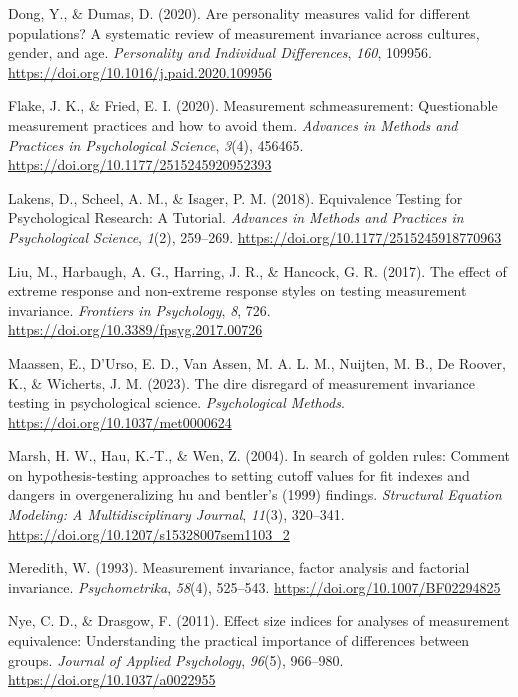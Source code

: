 \documentclass[
  man]{apa7}
\newlength{\cslhangindent}
\newenvironment{CSLReferences}[2] %
 {\begin{list}{}{%
  \setlength{\itemindent}{0pt}
  \setlength{\leftmargin}{0pt}
  \setlength{\parsep}{0pt}
  \ifodd #1
   \setlength{\leftmargin}{\cslhangindent}
   \setlength{\itemindent}{-1\cslhangindent}
  \fi
  \setlength{\itemsep}{#2\baselineskip}}}
 {\end{list}}
\begin{document}
\begin{CSLReferences}{1}{0}
Dong, Y., \& Dumas, D. (2020). Are personality measures valid for different populations? A systematic review of measurement invariance across cultures, gender, and age. \emph{Personality and Individual Differences}, \emph{160}, 109956. \url{https://doi.org/10.1016/j.paid.2020.109956}

Flake, J. K., \& Fried, E. I. (2020). Measurement schmeasurement: Questionable measurement practices and how to avoid them. \emph{Advances in Methods and Practices in Psychological Science}, \emph{3}(4), 456465. \url{https://doi.org/10.1177/2515245920952393}

Lakens, D., Scheel, A. M., \& Isager, P. M. (2018). Equivalence Testing for Psychological Research: A Tutorial. \emph{Advances in Methods and Practices in Psychological Science}, \emph{1}(2), 259--269. \url{https://doi.org/10.1177/2515245918770963}

Liu, M., Harbaugh, A. G., Harring, J. R., \& Hancock, G. R. (2017). The effect of extreme response and non-extreme response styles on testing measurement invariance. \emph{Frontiers in Psychology}, \emph{8}, 726. \url{https://doi.org/10.3389/fpsyg.2017.00726}

Maassen, E., D'Urso, E. D., Van Assen, M. A. L. M., Nuijten, M. B., De Roover, K., \& Wicherts, J. M. (2023). The dire disregard of measurement invariance testing in psychological science. \emph{Psychological Methods}. \url{https://doi.org/10.1037/met0000624}

Marsh, H. W., Hau, K.-T., \& Wen, Z. (2004). In search of golden rules: Comment on hypothesis-testing approaches to setting cutoff values for fit indexes and dangers in overgeneralizing hu and bentler's (1999) findings. \emph{Structural Equation Modeling: A Multidisciplinary Journal}, \emph{11}(3), 320--341. \url{https://doi.org/10.1207/s15328007sem1103_2}

Meredith, W. (1993). Measurement invariance, factor analysis and factorial invariance. \emph{Psychometrika}, \emph{58}(4), 525--543. \url{https://doi.org/10.1007/BF02294825}

Nye, C. D., \& Drasgow, F. (2011). Effect size indices for analyses of measurement equivalence: Understanding the practical importance of differences between groups. \emph{Journal of Applied Psychology}, \emph{96}(5), 966--980. \url{https://doi.org/10.1037/a0022955}


\end{CSLReferences}
\end{document}
